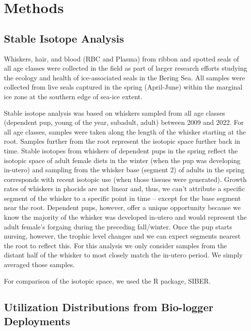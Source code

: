 \documentclass[
  letterpaper,
  DIV=11,
  numbers=noendperiod]{scrartcl}
\begin{document}
\section{Methods}\label{methods}

\subsection{Stable Isotope Analysis}\label{stable-isotope-analysis}

Whiskers, hair, and blood (RBC and Plasma) from ribbon and spotted seals
of all age classes were collected in the field as part of larger
research efforts studying the ecology and health of ice-associated seals
in the Bering Sea. All samples were collected from live seals captured
in the spring (April-June) within the marginal ice zone at the southern
edge of sea-ice extent.

Stable isotope analysis was based on whiskers sampled from all age
classes (dependent pup, young of the year, subadult, adult) between 2009
and 2022. For all age classes, samples were taken along the length of
the whisker starting at the root. Samples further from the root
represent the isotopic space further back in time. Stable isotopes from
whiskers of dependent pups in the spring reflect the isotopic space of
adult female diets in the winter (when the pup was developing in-utero)
and sampling from the whisker base (segment 2) of adults in the spring
corresponds with recent isotopic use (when those tissues were
generated). Growth rates of whiskers in phocids are not linear and,
thus, we can't attribute a specific segment of the whisker to a specific
point in time -- except for the base segment near the root. Dependent
pups, however, offer a unique opportunity because we know the majority
of the whisker was developed in-utero and would represent the adult
female's forgaing during the preceding fall/winter. Once the pup starts
nursing, however, the trophic level changes and we can expect segments
nearest the root to reflect this. For this analysis we only consider
samples from the distant half of the whisker to most closely match the
in-utero period. We simply averaged those samples.

For comparison of the isotopic space, we used the R package, SIBER.

\subsection{Utilization Distributions from Bio-logger
Deployments}\label{utilization-distributions-from-bio-logger-deployments}
\end{document}

